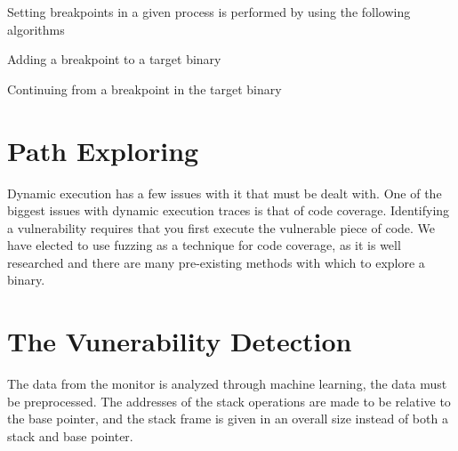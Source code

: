 \documentclass{article}
\begin{document}
Setting breakpoints in a given process is performed by using the following algorithms
\begin{algorithm}[H]
    \caption{Adding a breakpoint to a target binary}
\end{algorithm}

\begin{algorithm}[H]
    \caption{Continuing from a breakpoint in the target binary}
\end{algorithm}

\section {Path Exploring} Dynamic execution has a few issues with it that must be dealt with. One of the biggest issues
with dynamic execution traces is that of code coverage. Identifying a vulnerability requires that you first execute the
vulnerable piece of code. We have elected to use fuzzing as a technique for code coverage, as it is well researched and
there are many pre-existing methods with which to explore a binary.

\section {The Vunerability Detection} The data from the monitor is analyzed through machine learning, the data must be
preprocessed. The addresses of the stack operations are made to be relative to the base pointer, and the stack frame is
given in an overall size instead of both a stack and base pointer.
\end{document}
